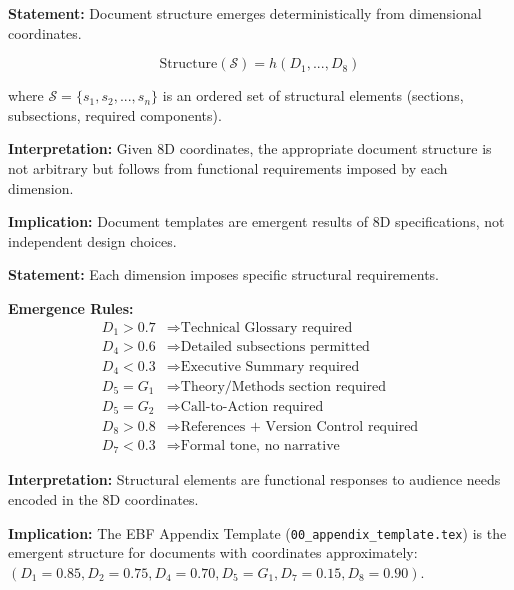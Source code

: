 \begin{tcolorbox}[colback=gray!5!white, colframe=gray!75!black,
    title=Axiom DT-5: Structure Emergence]
\textbf{Statement:} Document structure emerges deterministically from dimensional coordinates.

\begin{equation}
\text{Structure}(\mathcal{S}) = h(D_1, ..., D_8)
\end{equation}

where $\mathcal{S} = \{s_1, s_2, ..., s_n\}$ is an ordered set of structural elements
(sections, subsections, required components).

\textbf{Interpretation:} Given 8D coordinates, the appropriate document structure
is not arbitrary but follows from functional requirements imposed by each dimension.

\textbf{Implication:} Document templates are emergent results of 8D specifications,
not independent design choices.
\end{tcolorbox}

\begin{tcolorbox}[colback=gray!5!white, colframe=gray!75!black,
    title=Axiom DT-6: Structural Element Rules]
\textbf{Statement:} Each dimension imposes specific structural requirements.

\textbf{Emergence Rules:}
\begin{align}
D_1 > 0.7 &\Rightarrow \text{Technical Glossary required} \\
D_4 > 0.6 &\Rightarrow \text{Detailed subsections permitted} \\
D_4 < 0.3 &\Rightarrow \text{Executive Summary required} \\
D_5 = G_1 &\Rightarrow \text{Theory/Methods section required} \\
D_5 = G_2 &\Rightarrow \text{Call-to-Action required} \\
D_8 > 0.8 &\Rightarrow \text{References + Version Control required} \\
D_7 < 0.3 &\Rightarrow \text{Formal tone, no narrative}
\end{align}

\textbf{Interpretation:} Structural elements are functional responses to audience needs
encoded in the 8D coordinates.

\textbf{Implication:} The EBF Appendix Template (\texttt{00\_appendix\_template.tex})
is the emergent structure for documents with coordinates approximately:
$(D_1=0.85, D_2=0.75, D_4=0.70, D_5=G_1, D_7=0.15, D_8=0.90)$.
\end{tcolorbox}

